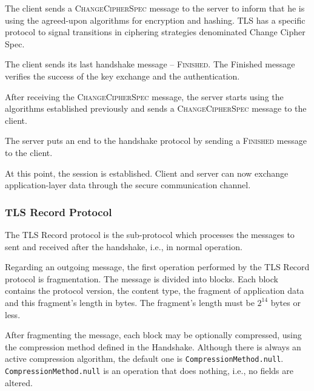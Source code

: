 \documentclass{sig-alternate-05-2015}
\newcommand{\msg}[1]{\textsc{{#1}}}
\begin{document}
The client sends a \msg{ChangeCipherSpec} message to the server to inform that he is using the agreed-upon algorithms for encryption and hashing. TLS has a specific protocol to signal transitions in ciphering strategies denominated Change Cipher Spec.

The client  sends its last handshake message -- \msg{Finished}. The Finished message verifies the success of the key exchange and the authentication.

After receiving the \msg{ChangeCipherSpec} message, the server starts using the algorithms established previously and sends a \msg{ChangeCipherSpec} message to the client.

The server puts an end to the handshake protocol by sending a \msg{Finished} message to the client.

At this point, the session is established. Client and server can now exchange application-layer data through the secure communication channel.

\subsubsection{TLS Record Protocol}

The TLS Record protocol is the sub-protocol which processes the messages to sent and received after the handshake, i.e., in normal operation.

Regarding an outgoing message, the first operation performed by the TLS Record protocol is fragmentation. The message is divided into blocks. %
Each block contains the protocol version, the content type, the fragment of application data and this fragment's length in bytes. The fragment's length must be $2^{14}$ bytes or less.

After fragmenting the message, each block may be optionally compressed, using the compression method defined in the Handshake.
Although there is always an active compression algorithm, the default one is \texttt{CompressionMethod.null}. \texttt{CompressionMethod.null} is an operation that does nothing, i.e., no fields are altered.
\end{document}
